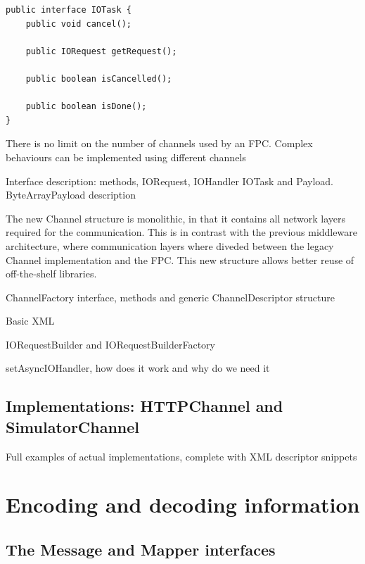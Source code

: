 \lstset{language=Java}
\begin{lstlisting}[float,floatplacement=H,caption=The IOTask interface,label={lst:iotask}]
public interface IOTask {
	public void cancel();
	
	public IORequest getRequest();
	
	public boolean isCancelled();
	
	public boolean isDone();
}
\end{lstlisting}







There is no limit on the number of channels used by an FPC. Complex behaviours can be implemented using different channels

Interface description: methods, IORequest, IOHandler IOTask and Payload.
ByteArrayPayload description

The new Channel structure is monolithic, in that it contains all network layers required for the communication. This is in contrast with the previous middleware architecture, where communication layers where diveded between the legacy Channel implementation and the FPC. This new structure allows better reuse of off-the-shelf libraries.

ChannelFactory interface, methods and generic ChannelDescriptor structure

Basic XML 

IORequestBuilder and IORequestBuilderFactory

setAsyncIOHandler, how does it work and why do we need it

\subsection{Implementations: HTTPChannel and SimulatorChannel}
\label{sec:channel.implementations}

Full examples of actual implementations, complete with XML descriptor snippets


\section{Encoding and decoding information}
\label{sec:components.mapper}

\subsection{The Message and Mapper interfaces}

